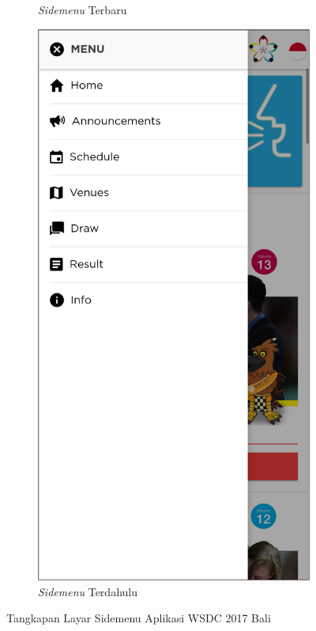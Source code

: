 \begin{figure}[H]
\begin{subfigure}[b]{0.3\textwidth}
         \caption{\textit{Sidemenu} Terbaru}
         \label{fig:ssSidebar}
     \end{subfigure}
     \hspace*{0.5in}
     \begin{subfigure}[b]{0.3\textwidth}
         \centering
         \includegraphics[width=\textwidth]{Gambar/SideBarOld.png}
         \caption{\textit{Sidemenu} Terdahulu}
         \label{fig:ssSidebarOld}
     \end{subfigure}
        \caption{Tangkapan Layar Sidemenu Aplikasi WSDC 2017 Bali}
        \label{fig:ssApk1}
\end{figure}


